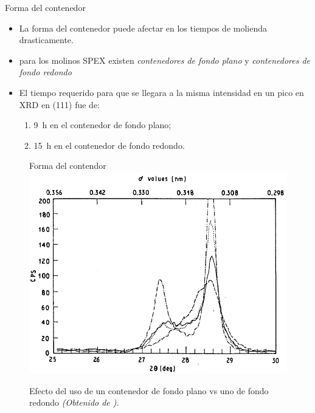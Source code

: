 \documentclass[%
spanish,
progressbar=head,
background=dark,
subsectionpage,
aspectratio=169
]{beamer}
\begin{document}
\begin{frame}{Forma del contenedor}
\begin{itemize}
    \item<1-> La forma del contenedor puede afectar en los tiempos de molienda drasticamente.
    \item<2-> para los molinos SPEX existen \emph{contenedores de fondo plano} y \emph{contenedores de fondo redondo}
    \item<3-> El tiempo requerido para que se llegara a la misma intensidad en un pico en XRD en (111) fue de:
    \begin{enumerate}
        \item \qty{9}{\hour} en el contenedor de fondo plano;
        \item \qty{15}{\hour} en el contenedor de fondo redondo.
    \end{enumerate}
\end{itemize}
\end{frame}
\begin{frame}
    \begin{figure}{Forma del contendor}
        \centering
        \includegraphics[width=0.85\linewidth]{figuras/efectoXRD.png}
        \caption{Efecto del uso de un contenedor de fondo plano vs uno de fondo redondo \textit{(Obtenido de \cite{harringa1992effects}).}}
    \end{figure}
\end{frame}
\end{document}
